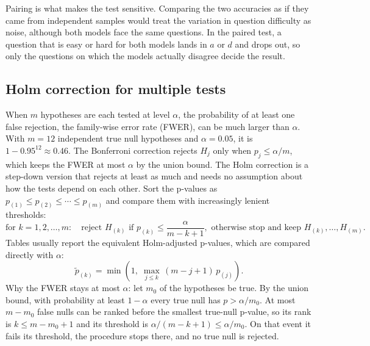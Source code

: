 {Pairing is what makes the test sensitive.
Comparing the two accuracies as if they came from independent samples would treat the variation in question difficulty as noise, although both models face the same questions.
In the paired test, a question that is easy or hard for both models lands in \(a\) or \(d\) and drops out, so only the questions on which the models actually disagree decide the result.

\subsection*{Holm correction for multiple tests}
When \(m\) hypotheses are each tested at level \(\alpha\), the probability of at least one false rejection, the family-wise error rate (FWER), can be much larger than \(\alpha\).
With \(m = 12\) independent true null hypotheses and \(\alpha = 0.05\), it is \(1 - 0.95^{12} \approx 0.46\).
The Bonferroni correction rejects \(H_j\) only when \(p_j \le \alpha/m\), which keeps the FWER at most \(\alpha\) by the union bound.
The Holm correction is a step-down version that rejects at least as much and needs no assumption about how the tests depend on each other.
Sort the p-values as \(p_{(1)} \le p_{(2)} \le \cdots \le p_{(m)}\) and compare them with increasingly lenient thresholds:
\[
\text{for } k = 1, 2, \ldots, m: \quad \text{reject } H_{(k)} \text{ if } p_{(k)} \le \frac{\alpha}{m-k+1}, \text{ otherwise stop and keep } H_{(k)}, \ldots, H_{(m)}.
\]
Tables usually report the equivalent Holm-adjusted p-values, which are compared directly with \(\alpha\):
\[
\tilde p_{(k)} = \min\left(1,\; \max_{j \le k}\, (m-j+1)\, p_{(j)}\right).
\]
Why the FWER stays at most \(\alpha\): let \(m_0\) of the hypotheses be true.
By the union bound, with probability at least \(1-\alpha\) every true null has \(p > \alpha/m_0\).
At most \(m - m_0\) false nulls can be ranked before the smallest true-null p-value, so its rank is \(k \le m - m_0 + 1\) and its threshold is \(\alpha/(m-k+1) \le \alpha/m_0\).
On that event it fails its threshold, the procedure stops there, and no true null is rejected.

}
